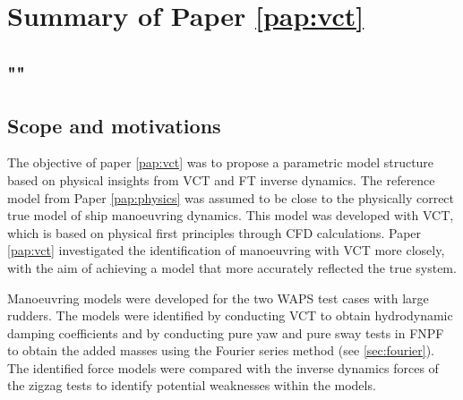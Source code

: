 \section{Summary of Paper \ref{pap:vct}}
\subsection*{""}
\subsection*{Scope and motivations}
The objective of paper \ref{pap:vct} was to propose a parametric model structure based on physical insights from VCT and FT inverse dynamics. The reference model from Paper \ref{pap:physics} was assumed to be close to the physically correct true model of ship manoeuvring dynamics. This model was developed with VCT, which is based on physical first principles through CFD calculations. Paper \ref{pap:vct} investigated the identification of manoeuvring with VCT more closely, with the aim of achieving a model that more accurately reflected the true system.

Manoeuvring models were developed for the two WAPS test cases with large rudders. The models were identified by conducting VCT to obtain hydrodynamic damping coefficients and by conducting pure yaw and pure sway tests in FNPF to obtain the added masses using the Fourier series method (see \autoref{sec:fourier}). The identified force models were compared with the inverse dynamics forces of the zigzag tests to identify potential weaknesses within the models.

